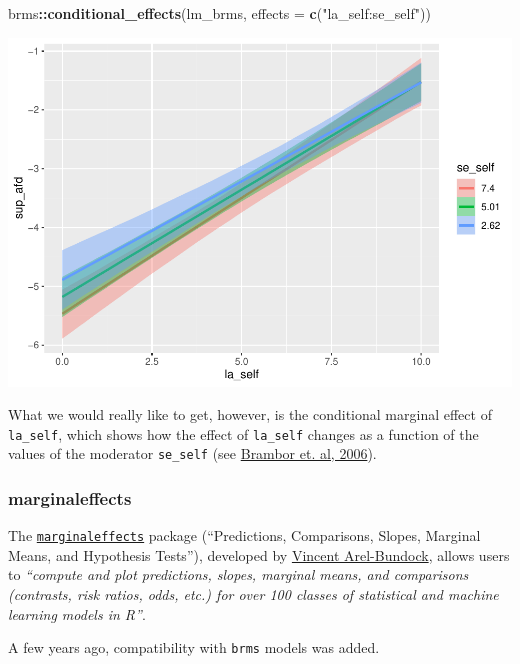 \documentclass[
  11pt,
]{article}
\newenvironment{Shaded}{\begin{snugshade}}{\end{snugshade}}
\newcommand{\AttributeTok}[1]{\textcolor[rgb]{0.13,0.29,0.53}{#1}}
\newcommand{\FunctionTok}[1]{\textcolor[rgb]{0.13,0.29,0.53}{\textbf{#1}}}
\newcommand{\NormalTok}[1]{#1}
\newcommand{\SpecialCharTok}[1]{\textcolor[rgb]{0.81,0.36,0.00}{\textbf{#1}}}
\newcommand{\StringTok}[1]{\textcolor[rgb]{0.31,0.60,0.02}{#1}}
\begin{document}
\begin{Shaded}
\begin{Highlighting}[]
\NormalTok{brms}\SpecialCharTok{::}\FunctionTok{conditional\_effects}\NormalTok{(lm\_brms,}
                          \AttributeTok{effects =} \FunctionTok{c}\NormalTok{(}\StringTok{"la\_self:se\_self"}\NormalTok{))}
\end{Highlighting}
\end{Shaded}

\includegraphics{02-02-lec_files/figure-latex/brms-conditional-effects-1.pdf}

What we would really like to get, however, is the conditional marginal effect of \texttt{la\_self}, which shows how the effect of \texttt{la\_self} changes as a function of the values of the moderator \texttt{se\_self} (see \href{https://www.jstor.org/stable/25791835}{Brambor et. al, 2006}).

\hypertarget{marginaleffects}{%
\subsubsection{marginaleffects}\label{marginaleffects}}

The \href{https://marginaleffects.com/}{\texttt{marginaleffects}} package (``Predictions, Comparisons, Slopes, Marginal Means, and Hypothesis Tests''), developed by \href{https://arelbundock.com/}{Vincent Arel-Bundock}, allows users to \emph{``compute and plot predictions, slopes, marginal means, and comparisons (contrasts, risk ratios, odds, etc.) for over 100 classes of statistical and machine learning models in R''}.

A few years ago, compatibility with \texttt{brms} models was added.
\end{document}
